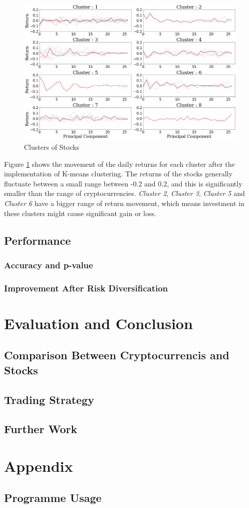 \documentclass[11pt]{article} %
\theoremstyle{plain}
\theoremstyle{definition}
\begin{document}
\begin{figure}[ht]
    \includegraphics[width=1\linewidth, center]{resources/stock_kmeans.png}
    \caption{Clusters of Stocks}
    \label{fig:stockkmeans}
\end{figure}

Figure \ref{fig:stockkmeans} shows the movement of the daily returns for each cluster after the implementation of K-means clustering. The returns of the stocks generally fluctuate between a small range between -0.2 and 0.2, and this is significantly smaller than the range of cryptocurrencies. \textsl{Cluster 2}, \textsl{Cluster 3}, \textsl{Cluster 5} and \textsl{Cluster 6} have a bigger range of return movement, which means investment in these clusters might cause significant gain or loss.

\subsection{Performance}
\subsubsection{Accuracy and p-value}
\subsubsection{Improvement After Risk Diversification}

\clearpage

\section{Evaluation and Conclusion}
\subsection{Comparison Between Cryptocurrencis and Stocks}
\subsection{Trading Strategy}
\subsection{Further Work}

\section{Appendix}
\subsection{Programme Usage}



\end{document}
